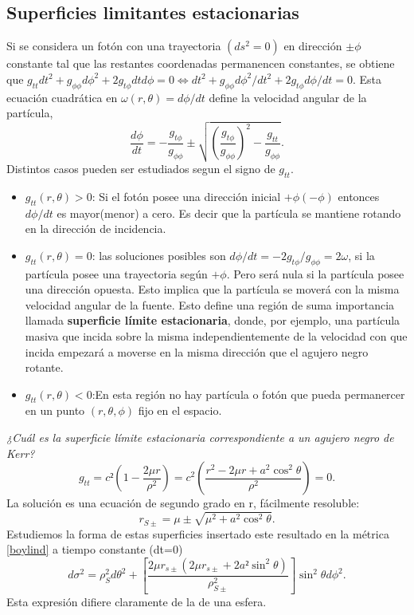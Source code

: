 \documentclass[12pt]{article}
\theoremstyle{plain}
\begin{document}
\subsection{Superficies limitantes estacionarias}
Si se considera un fotón con una trayectoria $(ds^2=0)$ en dirección $\pm\phi$ constante tal que las restantes coordenadas permanencen constantes, se obtiene que $g_{tt}dt^2+g_{\phi\phi}d\phi ^2+2g_{t\phi}dtd\phi=0 \Leftrightarrow dt^2+g_{\phi\phi}d\phi ^2/dt^2+2g_{t\phi}d\phi/dt=0$. Esta ecuación cuadrática en $\omega (r,\theta)=d\phi/dt$ define la velocidad angular de la partícula,
\begin{equation}
\frac{d\phi}{dt} = -\frac{g_{t\phi}}{g_{\phi\phi}}\pm\sqrt{\left(\frac{g_{t\phi}}{g_{\phi\phi}}\right)^2-\frac{g_{tt}}{g_{\phi\phi}}}.
\end{equation}
Distintos casos pueden ser estudiados segun el signo de $g_{tt}$.
\begin{itemize}
\item $g_{tt}(r,\theta)>0$: Si el fotón posee una dirección inicial $+\phi(-\phi)$ entonces $d\phi /dt$ es mayor(menor) a cero. Es decir que la partícula se mantiene rotando en la dirección de incidencia.
\item $g_{tt}(r,\theta)=0$: las soluciones posibles son $d\phi /dt=-2g_{t\phi}/g_{\phi\phi}=2\omega$, si la partícula posee una trayectoria según $+\phi$. Pero será nula si la partícula posee una dirección opuesta. Esto implica que la partícula se moverá con la misma velocidad angular de la fuente. Esto define una región de suma importancia llamada \textbf{superficie límite estacionaria}, donde, por ejemplo, una partícula masiva que incida sobre la misma independientemente de la velocidad con que incida empezará a moverse en la misma dirección que el agujero negro rotante.
\item $g_{tt}(r,\theta)<0$:En esta región no hay partícula o fotón que pueda permanercer en un punto $(r,\theta,\phi)$ fijo en el espacio.
\end{itemize}

\textit{¿Cuál es la superficie límite estacionaria correspondiente a un agujero negro de Kerr?}
\begin{equation}\nonumber
g_{tt}=c² \left( 1-\frac{2\mu r}{\rho ^2} \right)=c^2\left( \frac{r^2-2\mu r+a^2\cos ^2\theta}{\rho ^2} \right)=0.
\end{equation}
La solución es una ecuación de segundo grado en r, fácilmente resoluble:
\begin{equation}\label{sls}
r_{S\pm}=\mu\pm\sqrt{\mu ^2+a^2\cos ^2\theta}.
\end{equation}
Estudiemos la forma de estas superficies insertado este resultado en la métrica \ref{boylind} a tiempo constante (dt=0)
\begin{equation}
d\sigma ^2 = \rho _S^2d\theta ^2+ \left[ \frac{2\mu r_{s\pm}(2\mu r_{s\pm}+2a²\sin ^2\theta)}{\rho_{S\pm}^2}\right]\sin ^2\theta d\phi ^2.
\end{equation}
Esta expresión difiere claramente de la de una esfera.
\end{document}
